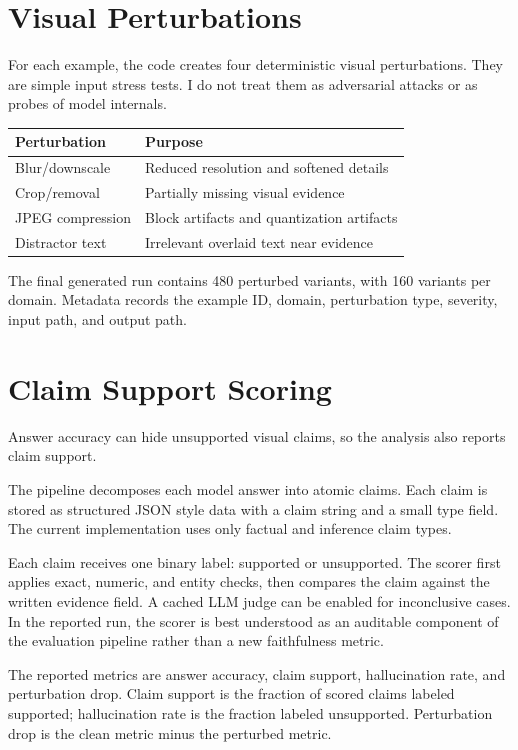 \documentclass{article}
\begin{document}
\section{Visual Perturbations}

For each example, the code creates four deterministic visual perturbations. They are simple input stress tests. I do not treat them as adversarial attacks or as probes of model internals.

\begin{center}
\begin{tabular}{ll}
\hline
\textbf{Perturbation} & \textbf{Purpose} \\
\hline
Blur/downscale & Reduced resolution and softened details \\
Crop/removal & Partially missing visual evidence \\
JPEG compression & Block artifacts and quantization artifacts \\
Distractor text & Irrelevant overlaid text near evidence \\
\hline
\end{tabular}
\end{center}

The final generated run contains 480 perturbed variants, with 160 variants per domain. Metadata records the example ID, domain, perturbation type, severity, input path, and output path.

\section{Claim Support Scoring}

Answer accuracy can hide unsupported visual claims, so the analysis also reports claim support.

The pipeline decomposes each model answer into atomic claims. Each claim is stored as structured JSON style data with a claim string and a small type field. The current implementation uses only factual and inference claim types.

Each claim receives one binary label: supported or unsupported. The scorer first applies exact, numeric, and entity checks, then compares the claim against the written evidence field. A cached LLM judge can be enabled for inconclusive cases. In the reported run, the scorer is best understood as an auditable component of the evaluation pipeline rather than a new faithfulness metric.

The reported metrics are answer accuracy, claim support, hallucination rate, and perturbation drop. Claim support is the fraction of scored claims labeled supported; hallucination rate is the fraction labeled unsupported. Perturbation drop is the clean metric minus the perturbed metric.
\end{document}
